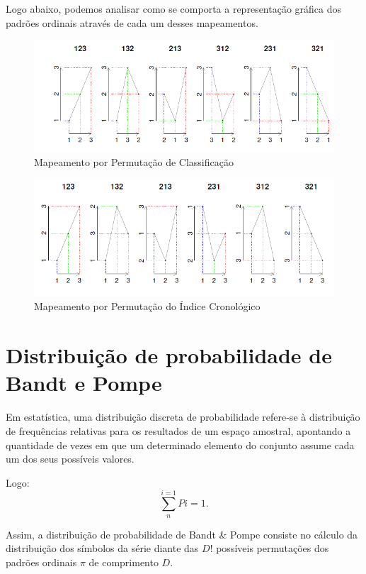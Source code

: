 Logo abaixo, podemos analisar como se comporta a representação gráfica dos padrões ordinais através de cada um desses mapeamentos.

\begin{figure}[!ht]
	\begin{center}
		\includegraphics[width=0.7\columnwidth]{imagens/rankPermutation.png}
        \caption{Mapeamento por Permutação de Classificação~\citep{tiedvalues}}
	\end{center}
\end{figure}

\begin{figure}[!ht]
	\begin{center}
		\includegraphics[width=0.7\columnwidth]{imagens/chronologicalIndex.png}
        \caption{Mapeamento por Permutação do Índice Cronológico~\citep{tiedvalues}}
	\end{center}
\end{figure}
				

\section{Distribuição de probabilidade de Bandt e Pompe}

Em estatística, uma distribuição discreta de probabilidade refere-se à distribuição de frequências relativas para os resultados de um espaço amostral, apontando a quantidade de vezes em que um determinado elemento do conjunto assume cada um dos seus possíveis valores.

Logo:
 $$\sum_{n}^{i=1} Pi = 1. $$ 

Assim, a distribuição de probabilidade de Bandt \& Pompe consiste no cálculo da distribuição dos símbolos da série diante das $D!$ possíveis permutações dos padrões ordinais $\pi$ de comprimento $D$.

